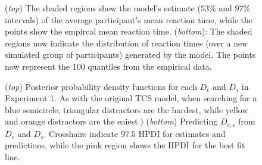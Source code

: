 \documentclass[smallextended, natbib]{svjour3}       %
\begin{document}
\begin{figure}
\centering
{}
\caption{(\textit{top}) The shaded regions show the model's estimate ($53\%$ and $97\%$ intervals) of the average participant's mean reaction time, while the points show the empircal mean reaction time. (\textit{bottom}): The shaded regions now indicate the distribution of reaction times (over a new simulated group of participants) generated by the model. The points now represent the 100 quantiles from the empirical data.}
\label{fig:buetti2019_a1}
\end{figure}

\begin{figure}
\centering
{}
\caption{(\textit{top}) Posterior probability density functions for each $D_c$ and $D_s$ in Experiment 1. As with the original TCS model, when searching for a blue semicircle, triangular distractors are the hardest, while yellow and orange distractors are the eaiest.) (\textit{bottom}) Predicting $D_{c,s}$ from $D_c$ and $D_s$. Crosshairs indicate $97.5$ HPDI for estimates and predictions, while the pink region shows the HPDI for the best fit line. }
\label{fig:buetti2019_D}
\end{figure}
\end{document}
